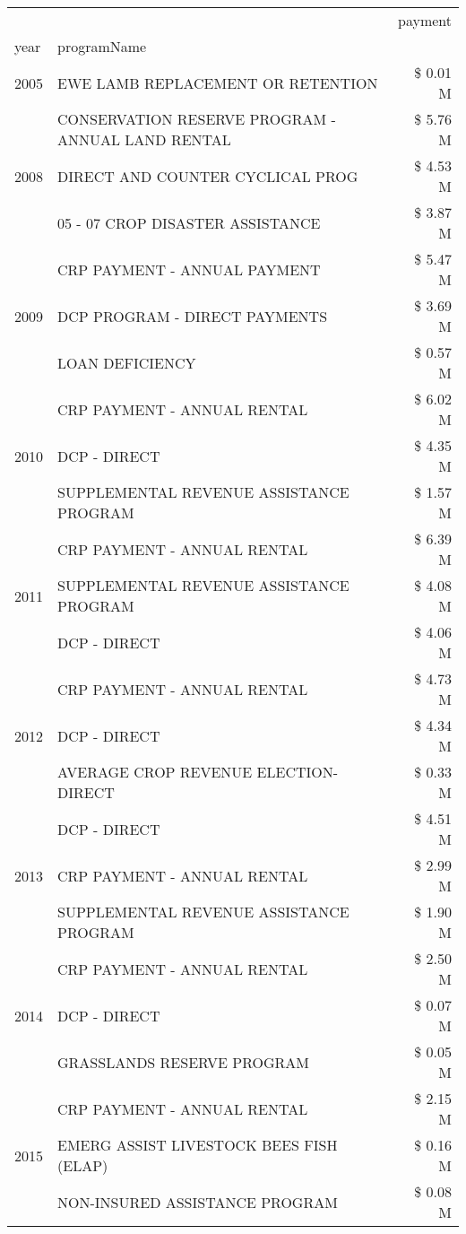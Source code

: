 \begin{tabular}{llr}
\toprule
 &  & payment \\
year & programName &  \\
\midrule
2005 & EWE LAMB REPLACEMENT OR RETENTION & \$ 0.01 M \\
\cline{1-3}
\multirow[t]{3}{*}{2008} & CONSERVATION RESERVE PROGRAM - ANNUAL LAND RENTAL & \$ 5.76 M \\
 & DIRECT AND COUNTER CYCLICAL PROG & \$ 4.53 M \\
 & 05 - 07 CROP DISASTER ASSISTANCE & \$ 3.87 M \\
\cline{1-3}
\multirow[t]{3}{*}{2009} & CRP PAYMENT - ANNUAL PAYMENT & \$ 5.47 M \\
 & DCP PROGRAM - DIRECT PAYMENTS & \$ 3.69 M \\
 & LOAN DEFICIENCY & \$ 0.57 M \\
\cline{1-3}
\multirow[t]{3}{*}{2010} & CRP PAYMENT - ANNUAL RENTAL & \$ 6.02 M \\
 & DCP - DIRECT & \$ 4.35 M \\
 & SUPPLEMENTAL REVENUE ASSISTANCE PROGRAM & \$ 1.57 M \\
\cline{1-3}
\multirow[t]{3}{*}{2011} & CRP PAYMENT - ANNUAL RENTAL & \$ 6.39 M \\
 & SUPPLEMENTAL REVENUE ASSISTANCE PROGRAM & \$ 4.08 M \\
 & DCP - DIRECT & \$ 4.06 M \\
\cline{1-3}
\multirow[t]{3}{*}{2012} & CRP PAYMENT - ANNUAL RENTAL & \$ 4.73 M \\
 & DCP - DIRECT & \$ 4.34 M \\
 & AVERAGE CROP REVENUE ELECTION-DIRECT & \$ 0.33 M \\
\cline{1-3}
\multirow[t]{3}{*}{2013} & DCP - DIRECT & \$ 4.51 M \\
 & CRP PAYMENT - ANNUAL RENTAL & \$ 2.99 M \\
 & SUPPLEMENTAL REVENUE ASSISTANCE PROGRAM & \$ 1.90 M \\
\cline{1-3}
\multirow[t]{3}{*}{2014} & CRP PAYMENT - ANNUAL RENTAL & \$ 2.50 M \\
 & DCP - DIRECT & \$ 0.07 M \\
 & GRASSLANDS RESERVE PROGRAM & \$ 0.05 M \\
\cline{1-3}
\multirow[t]{3}{*}{2015} & CRP PAYMENT - ANNUAL RENTAL & \$ 2.15 M \\
 & EMERG ASSIST LIVESTOCK BEES FISH (ELAP) & \$ 0.16 M \\
 & NON-INSURED ASSISTANCE PROGRAM & \$ 0.08 M \\

\end{tabular}
